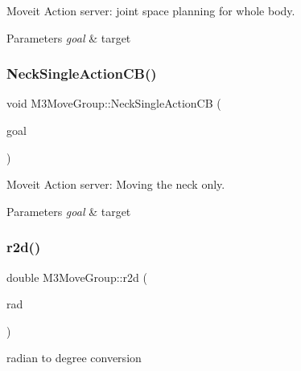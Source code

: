 Moveit Action server\+: joint space planning for whole body. 


\begin{DoxyParams}{Parameters}
{\em goal} & target \\
\hline
\end{DoxyParams}
\mbox{\label{classM3MoveGroup_aef5fd5bd7565b10b0e5d568bce824773}} 
\subsubsection{\texorpdfstring{Neck\+Single\+Action\+C\+B()}{NeckSingleActionCB()}}
{\footnotesize\ttfamily void M3\+Move\+Group\+::\+Neck\+Single\+Action\+CB (\begin{DoxyParamCaption}\item[{const m3\+\_\+moveit\+::\+Neck\+Tilt\+Goal\+Const\+Ptr \&}]{goal }\end{DoxyParamCaption})\hspace{0.3cm}{\ttfamily [inline]}}



Moveit Action server\+: Moving the neck only. 


\begin{DoxyParams}{Parameters}
{\em goal} & target \\
\hline
\end{DoxyParams}
\mbox{\label{classM3MoveGroup_a08ae3af12542a9dd44d5f823c8b3bb46}} 
\subsubsection{\texorpdfstring{r2d()}{r2d()}\hspace{0.1cm}{\footnotesize\ttfamily [1/2]}}
{\footnotesize\ttfamily double M3\+Move\+Group\+::r2d (\begin{DoxyParamCaption}\item[{double}]{rad }\end{DoxyParamCaption})\hspace{0.3cm}{\ttfamily [inline]}}



radian to degree conversion 


